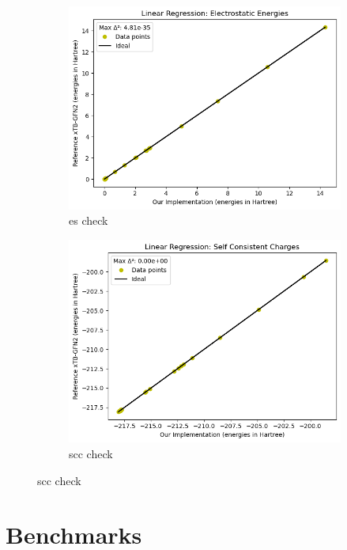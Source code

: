 \begin{figure}[H]
\centering
\begin{subfigure}{.5\textwidth}
  \centering
  \includegraphics[width=.8\linewidth]{images/results/es_check}
  \caption{es check}
  \label{fig:es_check}
\end{subfigure}%
\begin{subfigure}{.5\textwidth}
  \centering
  \includegraphics[width=.8\linewidth]{images/results/scc_check}
  \caption{scc check}
  \label{fig:scc_check}
\end{subfigure}
\end{figure}

\section{Benchmarks}
